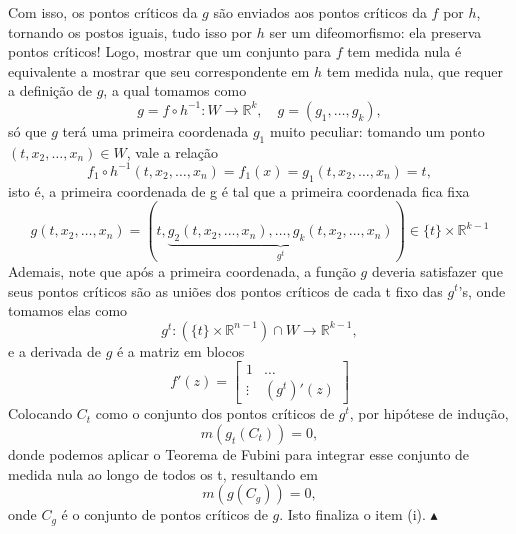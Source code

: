 \documentclass[../differential_topology.tex]{subfiles}
\begin{document}
\begin{proof*}
\begin{center}
\begin{tikzpicture}
		\end{tikzpicture}
	\end{center}
	Com isso, os pontos críticos da \(g\) são enviados aos pontos críticos da \(f\) por \(h\), tornando os postos iguais, tudo isso por \(h\) ser um difeomorfismo: ela preserva pontos críticos!
	Logo, mostrar que um conjunto para \(f\) tem medida nula é equivalente a mostrar que seu correspondente em \(h\) tem medida nula, que requer a definição de \(g\), a qual tomamos como
	\[
		g = f\circ h^{-1}:W\rightarrow \mathbb{R}^{k}, \quad g = (g_1, \dotsc , g_{k}),
	\]
	só que \(g\) terá uma primeira coordenada \(g_1\) muito peculiar: tomando um ponto \linebreak\((t, x_2, \dotsc , x_{n})\in W\), vale a relação
	\[
		f_1\circ h^{-1}(t, x_2, \dotsc , x_{n}) = f_1(x) = g_1(t, x_2, \dotsc , x_{n}) = t,
	\]
	isto é, a primeira coordenada de g é tal que a primeira coordenada fica fixa
	\[
		g(t, x_2, \dotsc , x_{n}) = (t, \underbrace{g_{2}(t, x_2, \dotsc , x_{n}), \dotsc , g_{k}(t, x_{2}, \dotsc , x_{n})}_{g^{t}}) \in \{t\}\times \mathbb{R}^{k-1}
	\]
	Ademais, note que após a primeira coordenada, a função \(g\) deveria satisfazer que seus pontos críticos são as uniões dos pontos críticos de cada t fixo das \(g^{t}\)'s, onde tomamos elas como
	\[
		g^{t}:(\{t\} \times \mathbb{R}^{n-1})\cap W\rightarrow \mathbb{R}^{k-1},
	\]
	e a derivada de \(g\) é a matriz em blocos
	\[
		f'(z) = \begin{bmatrix}
			1      & \dotsc      \\
			\vdots & (g^{t})'(z)
		\end{bmatrix}
	\]
	Colocando \(C_{t}\) como o conjunto dos pontos críticos de \(g^{t}\), por hipótese de indução,
	\[
		m(g_{t}(C_{t})) = 0,
	\]
	donde podemos aplicar o Teorema de Fubini para integrar esse conjunto de medida nula ao longo de todos os t, resultando em
	\[
		m(g(C_{g})) = 0,
	\]
	onde \(C_{g}\) é o conjunto de pontos críticos de \(g\). Isto finaliza o item (i). \(\blacktriangle\)


\end{proof*}
\end{document}
